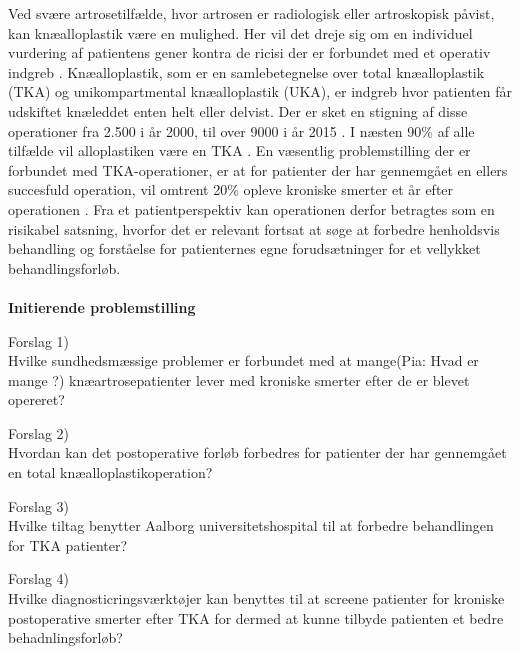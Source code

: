 Ved svære artrosetilfælde, hvor artrosen er radiologisk eller artroskopisk påvist, kan knæalloplastik være en mulighed. Her vil det dreje sig om en individuel vurdering af patientens gener kontra de ricisi der er forbundet med et operativ indgreb \citep{schroder}. Knæalloplastik, som er en samlebetegnelse over total knæalloplastik (TKA) og unikompartmental knæalloplastik (UKA), er indgreb hvor patienten får udskiftet knæleddet enten helt eller delvist. Der er sket en stigning af disse operationer fra 2.500 i år 2000, til over 9000 i år 2015 \citep{aarsrapport2016}.  I næsten 90\% af alle tilfælde vil alloplastiken være en TKA \citep{ugeskrift2011} \citep{aarsrapport2016}. En væsentlig problemstilling der er forbundet med TKA-operationer, er at for patienter der har gennemgået en ellers succesfuld operation, vil omtrent 20\% opleve kroniske smerter et år efter operationen \citep{bezwick2012}. Fra et patientperspektiv kan operationen derfor betragtes som en risikabel satsning, hvorfor det er relevant fortsat at søge at forbedre henholdsvis behandling og forståelse for patienternes egne forudsætninger for et vellykket behandlingsforløb.\\\\
\textbf{Initierende problemstilling}

Forslag 1)\\
Hvilke sundhedsmæssige problemer er forbundet med at mange(Pia: Hvad er mange ?)  knæartrosepatienter  lever med kroniske smerter efter de er blevet opereret?



Forslag 2)\\
Hvordan kan det postoperative forløb forbedres for patienter der har gennemgået en total knæalloplastikoperation?



Forslag 3)\\
Hvilke tiltag benytter Aalborg universitetshospital til at forbedre behandlingen for TKA patienter?




Forslag 4)\\
Hvilke diagnosticringsværktøjer kan benyttes til at screene patienter for  kroniske postoperative smerter efter TKA for dermed at kunne tilbyde patienten et bedre behadnlingsforløb?\\\\

